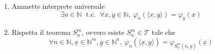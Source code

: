 \documentclass[12pt, answers]{exam}
\theoremstyle{plain}
\newcommand{\tc}{\; \text{ t.c. } \;}
\newcommand{\T}{\mathcal{T}}
\newcommand{\N}{\mathbb{N}}
\begin{document}
\begin{questions}
\begin{solution}
\begin{enumerate}
                \item Ammette interprete universale
                $$ \exists u \in \N \tc \forall x,y \in \N, \ \varphi_u (\langle x,y \rangle) = \varphi_y (x) $$
                
                \item Rispetta il teorema $S^m_n$, ovvero esiste $S^m_n \in \T$ tale che
                $$ \forall n \in \N, \underline{x} \in \N^m, \underline{y} \in \N^n, \ \varphi_n (\langle \underline{x}, \underline{y} \rangle) = \varphi_{S^m_n (n, \underline{y})} (\underline{x}) $$
            \end{enumerate}
        \end{solution}
    \end{questions}
\end{document}
